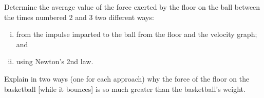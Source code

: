\begin{enumerate}[(a)]
{	\item Determine the average value of the force exerted by the floor on the ball between the times numbered 2 and 3 two different ways:
	\begin{enumerate}[(i)]
		\item from the impulse imparted to the ball from the floor and the velocity graph; and 
		\item using Newton's 2nd law.
	\end{enumerate}
}

\vspace{.1mm}
	Explain in two ways (one for each approach) why the force of the floor on the basketball [while it bounces] is so much greater than the basketball's weight.
\end{enumerate}



